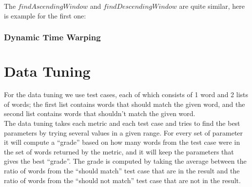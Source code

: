 \documentclass{article}
\begin{document}

The $findAscendingWindow$ and $findDescendingWindow$ are quite similar, here is example for the first one:



\subsubsection{Dynamic Time Warping}

\section{Data Tuning}

For the data tuning we use test cases, each of which consists of 1 word and 2 lists of words; the first list contains words that should match the given word, and the second list contains words that shouldn’t match the given word.\\

The data tuning takes each metric and each test case and tries to find the best parameters by trying several values in a given range. For every set of parameter it will compute a “grade” based on how many words from the test case were in the set of words returned by the metric, and it will keep the parameters that gives the best “grade”. The grade is computed by taking the average between the ratio of words from the “should match” test case that are in the result and the ratio of words from the “should not match” test case that are not in the result.
\end{document}
